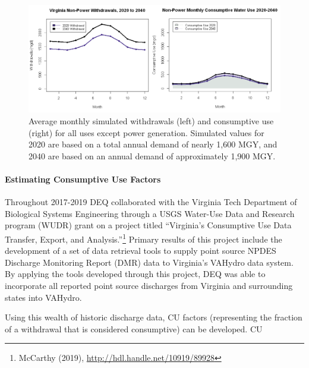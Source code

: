 \begin{figure}[h]
\includegraphics[scale=1.0]{sections/Xfigures/cu_monthly_2020-2040_2-panel.png}
\caption{Average monthly simulated withdrawals (left) and consumptive use (right) for all uses except power generation.  Simulated values for 2020 are based on a total annual demand of nearly 1,600 MGY, and 2040 are based on an annual demand of approximately 1,900 MGY.}
\label{fig:cumonthly}
\end{figure}

\paragraph{Estimating Consumptive Use Factors}\mbox{}\smallskip

\begin{multicols}{2}
\noindent Throughout 2017-2019 DEQ collaborated with the Virginia Tech Department of Biological Systems Engineering through a USGS Water-Use Data and Research program (WUDR) grant on a project titled “Virginia’s Consumptive Use Data Transfer, Export, and Analysis.”\footnote{McCarthy (2019), \href{http://hdl.handle.net/10919/89928}{http://hdl.handle.net/10919/89928}} Primary results of this project include the development of a set of data retrieval tools to supply point source NPDES Discharge Monitoring Report (DMR) data to Virginia’s VAHydro data system. By applying the tools developed through this project, DEQ was able to incorporate all reported point source discharges from Virginia and surrounding states into VAHydro.\medskip 

\noindent Using this wealth of historic discharge data, CU factors (representing the fraction of a withdrawal that is considered consumptive) can be developed. CU 
\end{multicols}

